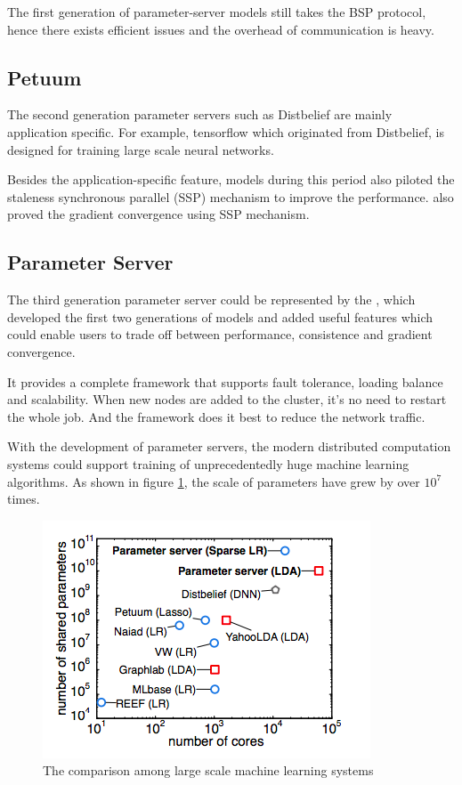\documentclass[journal]{IEEEtran}
\begin{document}
The first generation of parameter-server models still takes the BSP protocol, hence there exists efficient issues and the overhead of communication is heavy.

\subsection{Petuum}

The second generation parameter servers such as Distbelief \cite{DDN} are mainly application specific. For example, tensorflow \cite{abadi2016tensorflow} which originated from Distbelief, is designed for training large scale neural networks.

Besides the application-specific feature, models \cite{xing2015petuum} during this period also piloted the staleness synchronous parallel (SSP) mechanism to improve the performance. \cite{xing2015petuum} also proved the gradient convergence using SSP mechanism.

\subsection{Parameter Server}

The third generation parameter server could be represented by the \cite{SDML}, which developed the first two generations of models and added useful features which could enable users to trade off between performance, consistence and gradient convergence.

It provides a complete framework that supports fault tolerance, loading balance and scalability. When new nodes are added to the cluster, it's no need to restart the whole job. And the framework does it best to reduce the network traffic.

With the development of parameter servers, the modern distributed computation systems could support training of unprecedentedly huge machine learning algorithms. As shown in figure \ref{comparison_parameter_servers}, the scale of parameters have grew by over $10^7$ times.

\begin{figure}
\includegraphics[width=\linewidth]{comparison_parameter_servers.png}
\caption{The comparison among large scale machine learning systems}
\label{comparison_parameter_servers}
\end{figure}
\end{document}
